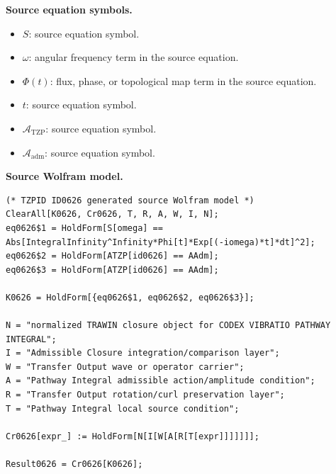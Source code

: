 \begin{minipage}[t]{0.49\linewidth}
\begingroup
\small
\raggedright
\textbf{Source equation symbols.}\par
\begin{itemize}[leftmargin=1.35em,itemsep=1pt,topsep=1pt,parsep=0pt]
    \item $S$: source equation symbol.
    \item $\omega$: angular frequency term in the source equation.
    \item $\Phi(t)$: flux, phase, or topological map term in the source equation.
    \item $t$: source equation symbol.
    \item $\mathcal{A}_{\mathrm{TZP}}$: source equation symbol.
    \item $\mathcal{A}_{\mathrm{adm}}$: source equation symbol.
\end{itemize}
\endgroup
\end{minipage}\hfill
\begin{minipage}[t]{0.47\linewidth}
\begingroup
\scriptsize
\raggedright
\textbf{Source Wolfram model.}\par
\begin{Verbatim}[fontsize=\tiny,breaklines=true,breakanywhere=true]
(* TZPID ID0626 generated source Wolfram model *)
ClearAll[K0626, Cr0626, T, R, A, W, I, N];
eq0626$1 = HoldForm[S[omega] == Abs[IntegralInfinity^Infinity*Phi[t]*Exp[(-iomega)*t]*dt]^2];
eq0626$2 = HoldForm[ATZP[id0626] == AAdm];
eq0626$3 = HoldForm[ATZP[id0626] == AAdm];

K0626 = HoldForm[{eq0626$1, eq0626$2, eq0626$3}];

N = "normalized TRAWIN closure object for CODEX VIBRATIO PATHWAY INTEGRAL";
I = "Admissible Closure integration/comparison layer";
W = "Transfer Output wave or operator carrier";
A = "Pathway Integral admissible action/amplitude condition";
R = "Transfer Output rotation/curl preservation layer";
T = "Pathway Integral local source condition";

Cr0626[expr_] := HoldForm[N[I[W[A[R[T[expr]]]]]]];

Result0626 = Cr0626[K0626];
\end{Verbatim}
\endgroup
\end{minipage}

